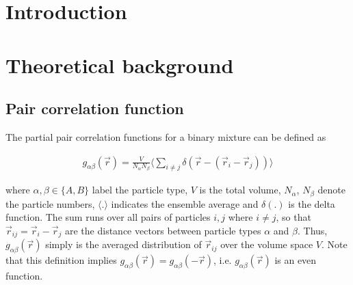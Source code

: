 \documentclass[DIV=9,11pt,BCOR=5mm,twoside=semi,abstract]{scrreprt}
\begin{document}
	\begin{abstract}
	
	\end{abstract}
	
	
	\AfterTOCHead[toc]{%
		\thispagestyle{empty}%
		\pagestyle{empty}%
	}
	
	\tableofcontents
	\thispagestyle{empty}
	\cleardoubleoddpage
	

	\chapter{Introduction}
	\label{chap:introduction}


	
	\chapter{Theoretical background}
	\label{chap:theory}

	\section{Pair correlation function }
	\label{sec:theory_pair_correlation_function}
	
	The partial pair correlation functions for a binary mixture can be defined as 
	
	\begin{align}
		g_{\alpha\beta}\left( \vec{r} \right) = \frac{V}{N_{\alpha}N_{\beta}} \langle \sum_{i \neq j} \delta \left( \vec{r} - \left( \vec{r}_i - \vec{r}_j \right) \right) \rangle
	\end{align}
	
	where $\alpha,\beta \in \{A,B\}$ label the particle type, $V$ is the total volume, $N_{\alpha}$, $N_{\beta}$ denote the particle numbers, $\langle . \rangle$ indicates the ensemble average and $\delta (.)$ is the delta function. The sum runs over all pairs of particles $i,j$ where $i \neq j$, so that $\vec{r}_{ij} = \vec{r}_i - \vec{r}_j$ are the distance vectors between particle types $\alpha$ and $\beta$. Thus, $g_{\alpha \beta} \left( \vec{r} \right)$ simply is the averaged distribution of  $\vec{r}_{ij}$ over the volume space $V$. Note that this definition implies $g_{\alpha\beta} (\vec{r}) = g_{\alpha\beta} (-\vec{r})$, i.e. $g_{\alpha\beta}(\vec{r})$ is an even function. \par
	
\end{document}
